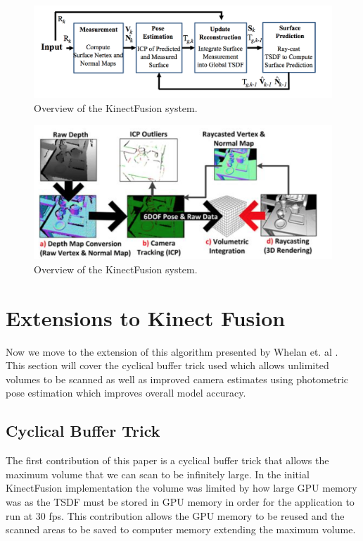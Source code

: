 \documentclass[10pt, twocolumn]{article}
\begin{document}
\begin{figure}
  \centering
  \includegraphics[width=1.0\linewidth]{workflow}
  \caption{Overview of the KinectFusion system.}
  \label{fig:workflow}
\end{figure}

\begin{figure}
  \centering
  \includegraphics[width=1.0\linewidth]{kinectfusion}
  \caption{Overview of the KinectFusion system.}
\end{figure}



\section{Extensions to Kinect Fusion}
Now we move to the extension of this algorithm presented by Whelan et. al \cite{whelan14}. This section will cover the cyclical buffer trick used which allows unlimited volumes to be scanned as well as improved camera estimates using photometric pose estimation which improves overall model accuracy.

\subsection{Cyclical Buffer Trick}
The first contribution of this paper is a cyclical buffer trick that allows the maximum volume that we can scan to be infinitely large. In the initial KinectFusion implementation the volume was limited by how large GPU memory was as the TSDF must be stored in GPU memory in order for the application to run at 30 fps. This contribution allows the GPU memory to be reused and the scanned areas to be saved to computer memory extending the maximum volume.
\end{document}
